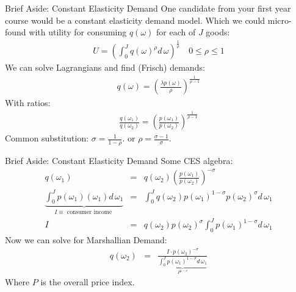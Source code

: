 \documentclass[xcolor=pdftex,dvipsnames,table,mathserif,aspectratio=169]{beamer}
\begin{document}
\begin{frame}{Brief Aside: Constant Elasticity Demand}
One candidate from your first year course would be a \alert{constant elasticity demand model}. Which we could micro-found with utility for consuming $q(\omega)$ for each of $J$ goods:
\begin{eqnarray*}
U  = \left( \int_{0}^{J} q(\omega)^{\rho} d\, \omega \right)^{\frac{1}{\rho}} \quad 0 \leq \rho \leq 1
\end{eqnarray*}
We can solve Lagrangians and find (Frisch) demands:
\begin{eqnarray*}
q(\omega) = \left( \frac{\lambda p(\omega)}{\rho} \right)^{\frac{1}{\rho-1}}
\end{eqnarray*}
With ratios:
\begin{eqnarray*}
\frac{q(\omega_1)}{q(\omega_2)} = \left( \frac{p(\omega_1)}{p(\omega_2)} \right)^{\frac{1}{\rho-1}}
\end{eqnarray*}
Common substitution: $\sigma = \frac{1}{1-\rho}$. or $\rho = \frac{\sigma-1}{\sigma}$.
\end{frame}


\begin{frame}{Brief Aside: Constant Elasticity Demand}
Some CES algebra:
\begin{eqnarray*}
q(\omega_1) &=&  q(\omega_2) \left( \frac{p(\omega_1)}{p(\omega_2)} \right)^{-\sigma}\\
\underbrace{\int_{0}^J p(\omega_1) (\omega_1)  d\, \omega_1}_{I \equiv \text{ consumer income }} &=&  \int_{0}^J q(\omega_2) p(\omega_1)^{1-\sigma} p(\omega_2)^{\sigma} d\, \omega_1\\
I &=& q(\omega_2) p(\omega_2)^{\sigma}  \int_{0}^J  p(\omega_1)^{1-\sigma}  d\, \omega_1
\end{eqnarray*}
Now we can solve for Marshallian Demand:
\begin{eqnarray*}
q(\omega_2) &=& \frac{I  \cdot p(\omega_2)^{-\sigma}}{\underbrace{\int_{0}^J  p(\omega_1)^{1-\sigma}  d\, \omega_1}_{P^{1-\sigma}}}
\end{eqnarray*}
Where $P$ is the overall price index.
\end{frame}
\end{document}
